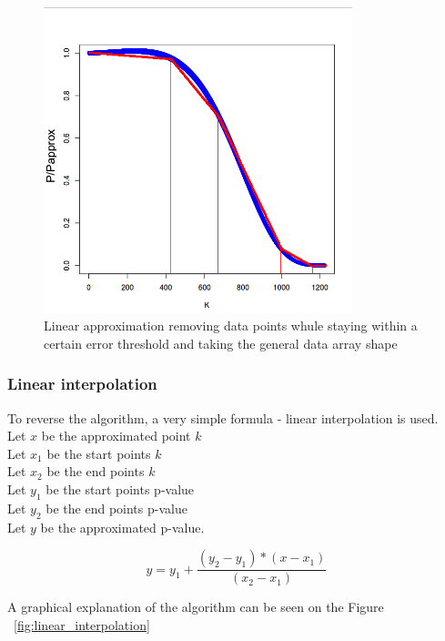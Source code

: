\documentclass[12pt]{article}
\begin{document}
\begin{figure}[H]
  \centering
  \includegraphics[width=0.8\textwidth]{linear_approximation}
  \caption{Linear approximation removing data points whule staying within a certain error threshold and taking the general data array shape}
  \label{fig:linear_approximation}
\end{figure}

\subsubsection{Linear interpolation}
To reverse the algorithm, a very simple formula - linear interpolation is used.\\
Let $x$ be the approximated point $k$\\
Let $x_1$ be the start points $k$\\
Let $x_2$ be the end points $k$\\
Let $y_1$ be the start points p-value \\
Let $y_2$ be the end points p-value\\
Let $y$ be the approximated p-value.

\begin{equation}
  y = y_1 + \frac{(y_2 - y_1) * (x - x_1)}{(x_2 - x_1)}
\end{equation}

A graphical explanation of the algorithm can be seen on the Figure ~\ref{fig:linear_interpolation}
\end{document}
